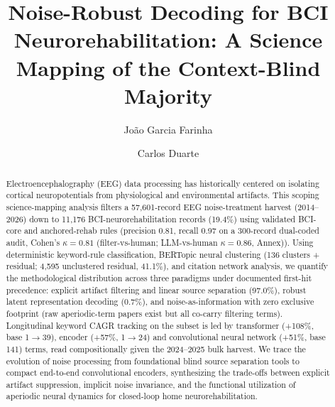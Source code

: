 \documentclass[preprint,12pt]{elsarticle}
\begin{document}
\begin{frontmatter}

\title{Noise-Robust Decoding for BCI Neurorehabilitation: A Science Mapping of the Context-Blind Majority} 

\author[inst1]{João Garcia Farinha}
\author[inst1]{Carlos Duarte}


\begin{abstract}
  Electroencephalography (EEG) data processing has historically centered on isolating cortical neuropotentials from physiological and environmental artifacts. This scoping science-mapping analysis filters a 57,601-record EEG noise-treatment harvest (2014--2026) down to 11,176 BCI-neurorehabilitation records (19.4\%) using validated BCI-core and anchored-rehab rules (precision 0.81, recall 0.97 on a 300-record dual-coded audit, Cohen's $\kappa = 0.81$ (filter-vs-human; LLM-vs-human $\kappa = 0.86$, Annex)). Using deterministic keyword-rule classification, BERTopic neural clustering (136 clusters + residual; 4,595 unclustered residual, 41.1\%), and citation network analysis, we quantify the methodological distribution across three paradigms under documented first-hit precedence: explicit artifact filtering and linear source separation (97.0\%), robust latent representation decoding (0.7\%), and noise-as-information with zero exclusive footprint (raw aperiodic-term papers exist but all co-carry filtering terms). Longitudinal keyword CAGR tracking on the subset is led by transformer (+108\%, base 1$\rightarrow$39), encoder (+57\%, 1$\rightarrow$24) and convolutional neural network (+51\%, base 141) terms, read compositionally given the 2024--2025 bulk harvest. We trace the evolution of noise processing from foundational blind source separation tools to compact end-to-end convolutional encoders, synthesizing the trade-offs between explicit artifact suppression, implicit noise invariance, and the functional utilization of aperiodic neural dynamics for closed-loop home neurorehabilitation.
\end{abstract}


\end{frontmatter}
\end{document}
